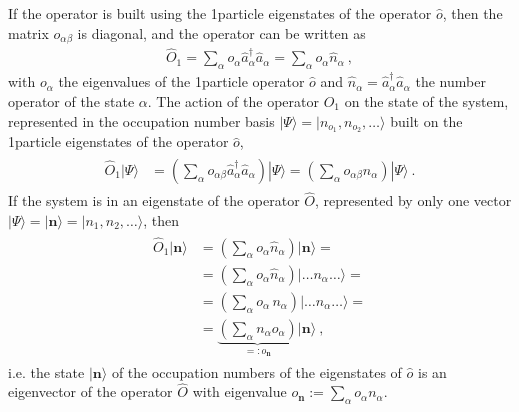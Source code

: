 \documentclass[letterpaper,10pt,english]{jupyterBook}
\begin{document}
\sphinxAtStartPar
If the operator is built using the 1\sphinxhyphen{}particle eigenstates of the operator \(\hat{o}\), then the matrix \(o_{\alpha \beta}\) is diagonal, and the operator can be written as
\begin{equation*}
\begin{split}\hat{O}_1 = \sum_{\alpha} o_{\alpha} \hat{a}_{\alpha}^\dagger \hat{a}_{\alpha}  = \sum_{\alpha} o_{\alpha} \hat{n}_{\alpha} \ ,\end{split}
\end{equation*}
\sphinxAtStartPar
with \(o_{\alpha}\) the eigenvalues of the 1\sphinxhyphen{}particle operator \(\hat{o}\) and \(\hat{n}_{\alpha} = \hat{a}^{\dagger}_{\alpha} \hat{a}_{\alpha}\) the number operator of the state \(\alpha\). The action of the operator \(\hat{O}_1\) on the state of the system, represented in the occupation number basis \(| \Psi \rangle = | n_{o_1}, n_{o_2}, \dots \rangle\) built on the 1\sphinxhyphen{}particle eigenstates of the operator \(\hat{o}\),
\begin{equation*}
\begin{split}\begin{aligned}
  \hat{O}_1 | \Psi \rangle 
  & = \left( \sum_{\alpha} o_{\alpha \beta} \hat{a}_{\alpha}^\dagger \hat{a}_{\alpha} \right) | \Psi \rangle 
    = \left( \sum_{\alpha} o_{\alpha \beta} \hat{n}_{\alpha} \right) | \Psi \rangle \ .
\end{aligned}\end{split}
\end{equation*}
\sphinxAtStartPar
If the system is in an eigenstate of the operator \(\hat{O}\), represented by only one vector \(| \Psi \rangle = | \mathbf{n} \rangle = | n_{1}, n_{2}, \dots \rangle\), then
\begin{equation}\label{equation:ch/quantum-mechanics/many-body/operators:eq:qft:operator:one-body:second-quantization:eig}
\begin{split}\begin{aligned}
  \hat{O}_1 | \mathbf{n} \rangle 
  & = \left( \sum_{\alpha} o_{\alpha} \hat{n}_{\alpha} \right) | \mathbf{n} \rangle = \\
  & = \left( \sum_{\alpha} o_{\alpha} \hat{n}_{\alpha} \right) | \dots n_\alpha \dots \rangle = \\
  & = \left( \sum_{\alpha} o_{\alpha} \, {n}_{\alpha} \right) | \dots n_\alpha \dots \rangle = \\
  & = \underbrace{\left( \sum_{\alpha} {n}_{\alpha} o_{\alpha} \right)}_{=:o_{\mathbf{n}}} | \mathbf{n} \rangle \ ,
\end{aligned}\end{split}
\end{equation}
\sphinxAtStartPar
i.e. the state \(| \mathbf{n} \rangle\) of the occupation numbers of the eigenstates of \(\hat{o}\) is an eigenvector of the operator \(\hat{O}\) with eigenvalue \(o_{\mathbf{n}} := \sum_{\alpha} o_{\alpha} n_{\alpha}\).
\end{document}
